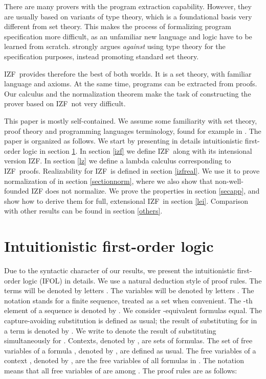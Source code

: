 \documentclass{LMCS}
\newcommand{\izfr}{IZF}
\newcommand{\iizfr}{IZF}
\begin{document}
There are many provers with the program extraction capability. However, 
they are usually based on variants of type theory, which is a foundational basis very different from set
theory. This makes the process of formalizing program specification more
difficult, as an unfamiliar new language and logic have to be learned from
scratch. \cite{lamport99} strongly argues \emph{against} using type theory
for the specification purposes, instead promoting standard set theory. 

\izfr\ provides therefore the best of both worlds. It is a set theory,
with familiar language and axioms. At the same time, programs can be
extracted from proofs. Our  calculus and the normalization
theorem make the task of constructing the prover based on \izfr\ not very
difficult.

This paper is mostly self-contained. We assume some familiarity with
set theory, proof theory and programming languages terminology, found for example 
in \cite{kunen,urzy,pierce}. The paper is organized as follows. We start by presenting in details
intuitionistic first-order logic in section \ref{ifol}. In section \ref{izf} we
define \izfr\ along with its intensional version \iizfr. In section \ref{lz} we define a
lambda calculus  corresponding to \iizfr\ proofs. Realizability for
\iizfr\ is defined in section \ref{izfreal}. We use it to prove normalization of  in
section \ref{sectionnorm}, where we also show that non-well-founded IZF does
not normalize. We prove the properties in section \ref{secapp}, and show how to derive them 
for full, extensional \izfr\ in section \ref{lei}. Comparison with other results can be found in section \ref{others}.

\section{Intuitionistic first-order logic}\label{ifol}

Due to the syntactic character of our results, we present the intuitionistic first-order logic
(IFOL) in details. We use a natural deduction style of proof rules. The terms will be denoted by
letters . The variables will be denoted by letters . The notation  stands for a finite sequence, treated as a set when
convenient. The -th element of a sequence is denoted by . We consider -equivalent
formulas equal. The capture-avoiding substitution is defined as usual; the
result of substituting  for  in a term  is denoted by . We
write  to denote the result
of substituting simultaneously  for . Contexts, denoted by , are sets of formulas. 
The set of free variables of a formula , denoted by , are
defined as usual. The free variables of a context , denoted by , are
the free variables of all formulas in . The notation  means
that all free variables of  are among . The proof rules are as follows:
\end{document}

